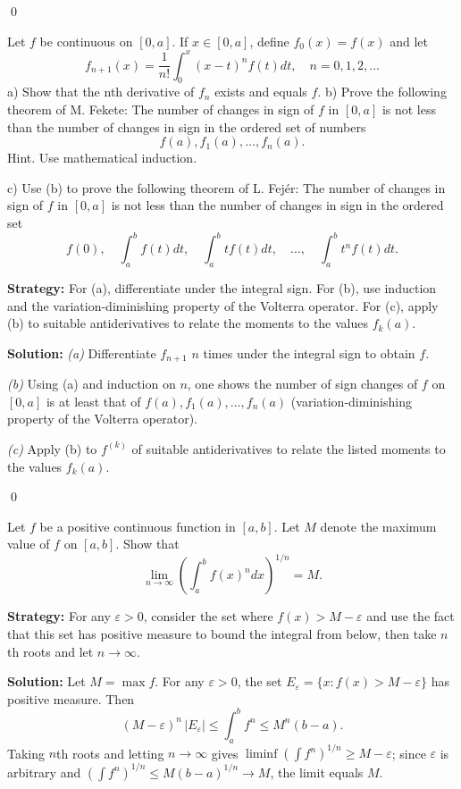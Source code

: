 \qed
\begin{problembox}
Let $f$ be continuous on $[0, a]$. If $x \in [0, a]$, define $f_0(x) = f(x)$ and let 
\[f_{n+1}(x) = \frac{1}{n!} \int_0^x (x - t)^n f(t) dt, \quad n = 0, 1, 2, \ldots\]
a) Show that the nth derivative of $f_n$ exists and equals $f$.
b) Prove the following theorem of M. Fekete: The number of changes in sign of $f$ in $[0, a]$ is not less than the number of changes in sign in the ordered set of numbers 
\[f(a), f_1(a), \ldots, f_n(a).\]
Hint. Use mathematical induction.

c) Use (b) to prove the following theorem of L. Fejér: The number of changes in sign of $f$ in $[0, a]$ is not less than the number of changes in sign in the ordered set
\[f(0), \quad \int_{a}^{b} f(t) dt, \quad \int_{a}^{b} t f(t) dt, \quad \ldots, \quad \int_{a}^{b} t^{n} f(t) dt.\]
\end{problembox}

\noindent\textbf{Strategy:} For (a), differentiate under the integral sign. For (b), use induction and the variation-diminishing property of the Volterra operator. For (c), apply (b) to suitable antiderivatives to relate the moments to the values $f_k(a)$.

\bigskip\noindent\textbf{Solution:}
\textit{(a)} Differentiate $f_{n+1}$ $n$ times under the integral sign to obtain $f$. 

\textit{(b)} Using (a) and induction on $n$, one shows the number of sign changes of $f$ on $[0,a]$ is at least that of $f(a),f_1(a),\dots,f_n(a)$ (variation-diminishing property of the Volterra operator).

\textit{(c)} Apply (b) to $f^{(k)}$ of suitable antiderivatives to relate the listed moments to the values $f_k(a)$.




\qed
\begin{problembox}
Let $f$ be a positive continuous function in $[a, b]$. Let $M$ denote the maximum value of $f$ on $[a, b]$. Show that
\[\lim_{n \to \infty} \left( \int_{a}^{b} f(x)^{n} dx \right)^{1/n} = M.\]
\end{problembox}

\noindent\textbf{Strategy:} For any $\varepsilon > 0$, consider the set where $f(x) > M - \varepsilon$ and use the fact that this set has positive measure to bound the integral from below, then take $n$th roots and let $n \to \infty$.

\bigskip\noindent\textbf{Solution:}
Let $M=\max f$. For any $\varepsilon>0$, the set $E_\varepsilon=\{x:f(x)>M-\varepsilon\}$ has positive measure. Then
\[(M-\varepsilon)^n\,|E_\varepsilon|\le \int_a^b f^n\le M^n(b-a).
\]
Taking $n$th roots and letting $n\to\infty$ gives $\liminf (\int f^n)^{1/n}\ge M-\varepsilon$; since $\varepsilon$ is arbitrary and $(\int f^n)^{1/n}\le M(b-a)^{1/n}\to M$, the limit equals $M$.




